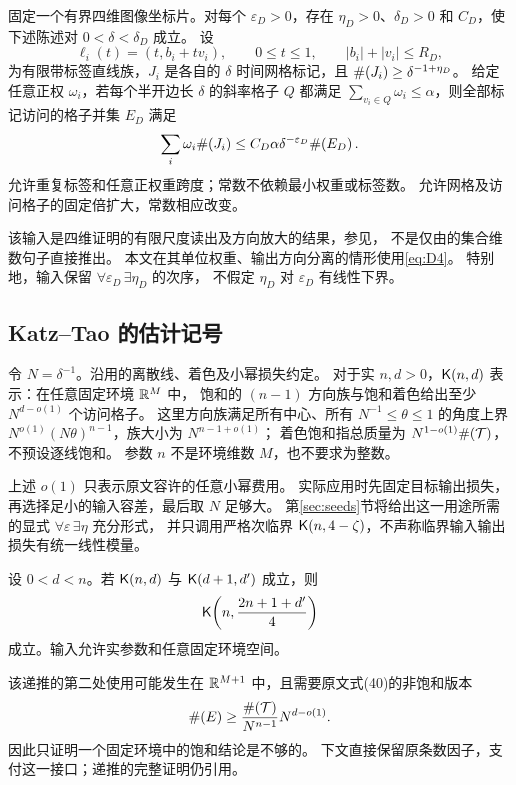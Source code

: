 \begin{inputthm}\label{input:D4}
固定一个有界四维图像坐标片。对每个 $\varepsilon_D>0$，存在
$\eta_D>0$、$\delta_D>0$ 和 $C_D$，使下述陈述对 $0<\delta<\delta_D$ 成立。
设
\[
 \ell_i(t)=(t,b_i+t v_i),\qquad 0\le t\le1,\qquad
 |b_i|+|v_i|\le R_D,
\]
为有限带标签直线族，$J_i$ 是各自的 $\delta$ 时间网格标记，且
$\#\!\left(J_i\right)\ge\delta^{-1+\eta_D}$。
给定任意正权 $\omega_i$，若每个半开边长 $\delta$ 的斜率格子 $Q$ 都满足
$\sum_{v_i\in Q}\omega_i\le\alpha$，则全部标记访问的格子并集 $E_D$ 满足
\begin{equation}\label{eq:D4}
 \sum_i\omega_i\#\!\left(J_i\right)
 \le C_D\alpha\delta^{-\varepsilon_D}\#\!\left(E_D\right).
\end{equation}
允许重复标签和任意正权重跨度；常数不依赖最小权重或标签数。
允许网格及访问格子的固定倍扩大，常数相应改变。
\end{inputthm}

该输入是四维证明的有限尺度读出及方向放大的结果，参见\cite{ArchiveSource,ArchiveDIR}，
不是仅由\cite[Theorem 1.1]{OAI4}的集合维数句子直接推出。
本文在其单位权重、输出方向分离的情形使用\eqref{eq:D4}。
特别地，输入保留 $\forall\varepsilon_D\,\exists\eta_D$ 的次序，
不假定 $\eta_D$ 对 $\varepsilon_D$ 有线性下界。

\subsection{Katz--Tao 的估计记号}

令 $N=\delta^{-1}$。沿用\cite[Definitions 5.1, 5.2, 6.1]{KT}的离散线、着色及小幂损失约定。
对于实 $n,d>0$，$\mathsf K(n,d)$ 表示：在任意固定环境 $\mathbb R^M$ 中，
饱和的 $(n-1)$ 方向族与饱和着色给出至少 $N^{d-o(1)}$ 个访问格子。
这里方向族满足所有中心、所有 $N^{-1}\le\theta\le1$ 的角度上界
$N^{o(1)}(N\theta)^{n-1}$，族大小为 $N^{n-1+o(1)}$；
着色饱和指总质量为 $N^{1-o(1)}\#\!\left(\mathcal T\right)$，不预设逐线饱和。
参数 $n$ 不是环境维数 $M$，也不要求为整数。

上述 $o(1)$ 只表示原文容许的任意小幂费用。
实际应用时先固定目标输出损失，再选择足小的输入容差，最后取 $N$ 足够大。
第\ref{sec:seeds}节将给出这一用途所需的显式 $\forall\varepsilon\,\exists\eta$ 充分形式，
并只调用严格次临界 $\mathsf K(n,4-\zeta)$，不声称临界输入输出损失有统一线性模量。

\begin{inputthm}\label{input:KT}
设 $0<d<n$。若 $\mathsf K(n,d)$ 与 $\mathsf K(d+1,d')$ 成立，则
\begin{equation}\label{eq:KT}
  \mathsf K\!\left(n,\frac{2n+1+d'}4\right)
\end{equation}
成立。输入允许实参数和任意固定环境空间。
\end{inputthm}

该递推的第二处使用可能发生在 $\mathbb R^{M+1}$ 中，且需要原文式(40)的非饱和版本
\begin{equation}\label{eq:KT-unsaturated}
  \#\!\left(E\right)\ge
  \frac{\#\!\left(\mathcal T\right)}{N^{n-1}}N^{d-o(1)}.
\end{equation}
因此只证明一个固定环境中的饱和结论是不够的。
下文直接保留原条数因子，支付这一接口；递推的完整证明仍引用\cite{KT}。
